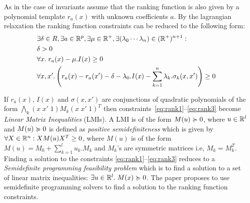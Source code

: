 As in the case of invariants assume that the ranking function is also given by
a polynomial template $r_a(x)$ with unknown coefficients $a$. By the lagrangian
relaxation the ranking function constraints can be reduced to the following form:
%
\begin{align}
& \nonumber \exists \delta \in R, \exists a \in \real^p, \exists \mu \in \real^+, \exists (\lambda_0 \cdots \lambda_n) \in (\real^+)^{n+1} : \\
& \delta > 0 \label{eq:rank1}\\
& \forall x. \; r_a(x) - \mu.I(x)  \ge 0 \label{eq:rank2}\\
& \forall x,x'. \left( r_a(x) - r_a(x') - \delta - \lambda_0.I(x) - \sum \limits_{k=1}^{n} \lambda_k. \sigma_k(x,x') \right) \ge 0 \label{eq:rank3}
\end{align}

If $r_a(x)$, $I(x)$ and $\sigma(x,x')$ are conjunctions of quadratic polynomials 
of the form $\bigwedge_k (x \; x' \; 1) M_k (x \; x' \; 1)^T$ then constraints~\ref{eq:rank1}--\ref{eq:rank3} become \emph{Linear Matrix Inequalities} (LMIs). A LMI is of the form  $M(u) \succcurlyeq 0$, where $u \in \mathbb{R}^l$ and 
$M(u) \succcurlyeq 0$ is defined as \emph{positive semidefiniteness} which is 
given by $\forall X \in \mathbb{R}^n: X M(u) X^T \ge 0$, where 
$M(u)$ is of the form $M(u) = M_0 + \sum \limits_{k=1}^{l} u_k. M_k$ 
and $M_k$'s are symmetric matrices i.e, $M_k = M_k^T$.
Finding a solution to the constraints \ref{eq:rank1}--\ref{eq:rank3}
reduces to a \emph{Semidefinite programming feasibility problem} which 
is to find a solution to a set of linear
matrix inequalities: $\exists u \in \mathbb{R}^l. \; M(x) \succcurlyeq 0$.
The paper proposes to use semidefinite programming solvers 
to find a solution to the ranking function constraints.

